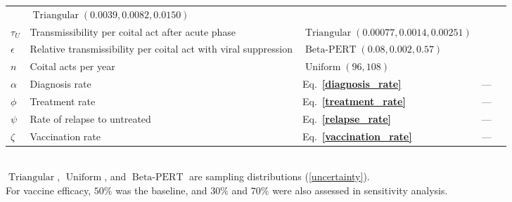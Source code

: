 \documentclass{article}
\renewcommand{\eqref}[1]{\textbf{\ref{#1}}}
\DeclareMathOperator{\Uniform}{Uniform}
\DeclareMathOperator{\Triangular}{Triangular}
\DeclareMathOperator{\BetaPERT}{Beta-PERT}
\begin{document}
\begin{table}
\begin{tabularx}{\textwidth}{lXlll}
    & $\Triangular(0.0039, 0.0082, 0.0150)$
    & \cite{Wawer2005-us, Skarbinski2015-ni}
    \\
    $\tau_{U}$ & Transmissibility per coital act after acute phase
    & $\Triangular(0.00077, 0.0014, 0.00251)$
    & \cite{Hughes2012-so}
    \\
    $\epsilon$ & Relative transmissibility per coital act with
    viral suppression & $\BetaPERT(0.08, 0.002, 0.57)$
    & \cite{Donnell2010-xo, attia_2009, wilson_2012, jia_2013,
      rodger_2016}
    \\
    $n$ & Coital acts per year & $\Uniform(96, 108)$
    & \cite{Wawer2005-us, Abdool_Karim2010-cm}
    \\
    $\alpha$ & Diagnosis rate & Eq.~\eqref{diagnosis_rate} & ---
    \\
    $\phi$ & Treatment rate & Eq.~\eqref{treatment_rate} & ---
    \\
    $\psi$ & Rate of relapse to untreated & Eq.~\eqref{relapse_rate} & ---
    \\
    $\zeta$ & Vaccination rate & Eq.~\eqref{vaccination_rate} & ---
    \\ \hline
  \end{tabularx}
  \\[5pt]
  $\Triangular$, $\Uniform$, and $\BetaPERT$ are sampling
  distributions (\autoref{uncertainty}).
  \\
  For vaccine efficacy, $50\%$ was the baseline, and $30\%$ and $70\%$
  were also assessed in sensitivity analysis.
\end{table}
\end{document}
